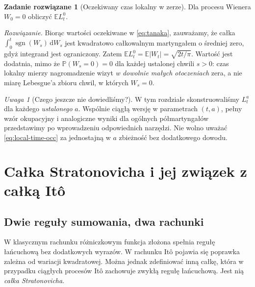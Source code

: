 \documentclass[11pt,a4paper,oneside]{report}
\numberwithin{equation}{chapter}
\theoremstyle{plain}
\theoremstyle{definition}
\newtheorem{zadanie}{Zadanie rozwiązane}[chapter]
\theoremstyle{remark}
\newtheorem{uwaga}{Uwaga}[chapter]
\newcommand{\Prob}{\mathbb{P}}
\newcommand{\E}{\mathbb{E}}
\newcommand{\dd}{\mathrm{d}}
\begin{document}
\begin{zadanie}[Oczekiwany czas lokalny w zerze]
Dla procesu Wienera $W_0=0$ obliczyć $\E L_t^0$.

\emph{Rozwiązanie.} Biorąc wartości oczekiwane w
\eqref{eq:tanaka}, zauważamy, że całka
$\int_0^t\operatorname{sgn}(W_s)\,\dd W_s$ jest
kwadratowo całkowalnym martyngałem o średniej zero,
gdyż integrand jest ograniczony. Zatem
$\E L_t^0=\E|W_t|=\sqrt{2t/\pi}$.
Wartość jest dodatnia, mimo że $\Prob(W_s=0)=0$
dla każdej ustalonej chwili $s>0$: czas lokalny
mierzy nagromadzenie wizyt \emph{w dowolnie małych
otoczeniach} zera, a nie miarę Lebesgue'a zbioru
chwil, w których $W_s=0$.
\end{zadanie}

\begin{uwaga}[Czego jeszcze nie dowiedliśmy?]
W tym rozdziale skonstruowaliśmy $L_t^a$ dla każdego
\emph{ustalonego} $a$. Wspólnie ciągłą wersję w
parametrach $(t,a)$, pełny wzór okupacyjny i
analogiczne wyniki dla ogólnych półmartyngałów
przedstawimy po wprowadzeniu odpowiednich narzędzi.
Nie wolno uważać \eqref{eq:local-time-occ} za
jednostajną w $a$ zbieżność bez dodatkowego dowodu.
\end{uwaga}


\chapter{Całka Stratonovicha i jej związek z całką Itô}
\label{chap:volIII:04}
\par\smallskip{}\par\smallskip

\label{ch:stratonovich}

\section{Dwie reguły sumowania, dwa rachunki}\label{sec:volIII:04:01}
W klasycznym rachunku różniczkowym funkcja złożona
spełnia regułę łańcuchową bez dodatkowych wyrazów.
W rachunku Itô pojawia się poprawka zależna od wariacji
kwadratowej. Można jednak zdefiniować inną całkę,
która w przypadku ciągłych procesów Itô zachowuje
zwykłą regułę łańcuchową. Jest nią \emph{całka
Stratonovicha}.
\end{document}
